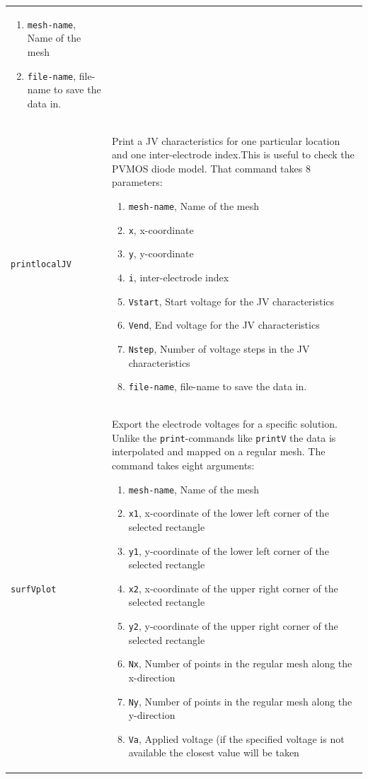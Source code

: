 \documentclass[noshowpacs,preprintnumbers,amsmath,amssymb, letter]{revtex4}
\begin{document}
\begin{longtable}{p{}p{}}
\begin{enumerate}
\item \texttt{mesh-name}, Name of the mesh
\item \texttt{file-name}, file-name to save the data in.
\end{enumerate}\\
\texttt{printlocalJV}	& Print a JV characteristics for one particular location and one inter-electrode index.This is useful to check the PVMOS diode model. That command takes 8 parameters:
\begin{enumerate}
\item \texttt{mesh-name}, Name of the mesh
\item \texttt{x}, x-coordinate
\item \texttt{y}, y-coordinate
\item \texttt{i}, inter-electrode index
\item \texttt{Vstart}, Start voltage for the JV characteristics
\item \texttt{Vend}, End voltage for the JV characteristics
\item \texttt{Nstep}, Number of voltage steps in the JV characteristics
\item \texttt{file-name}, file-name to save the data in.
\end{enumerate}\\
\texttt{surfVplot}		& Export the electrode voltages for a specific solution. Unlike the \texttt{print}-commands like \texttt{printV} the data is interpolated and mapped on a regular mesh. The command takes eight arguments:
\begin{enumerate}
\item \texttt{mesh-name}, Name of the mesh
\item \texttt{x1}, x-coordinate of the lower left corner of the selected rectangle
\item \texttt{y1}, y-coordinate of the lower left corner of the selected rectangle
\item \texttt{x2}, x-coordinate of the upper right corner of the selected rectangle
\item \texttt{y2}, y-coordinate of the upper right corner of the selected rectangle
\item \texttt{Nx}, Number of points in the regular mesh along the x-direction
\item \texttt{Ny}, Number of points in the regular mesh along the y-direction
\item \texttt{Va}, Applied voltage (if the specified voltage is not available the closest value will be taken

\end{enumerate}
\end{longtable}
\end{document}
